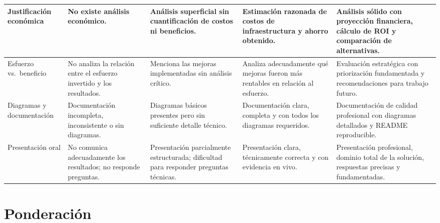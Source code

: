 \documentclass[12pt,a4paper]{article}
\begin{document}
\begin{longtable}{|p{2.8cm}|p{2.9cm}|p{2.9cm}|p{2.9cm}|p{2.9cm}|}
Justificación económica &
No existe análisis económico. &
Análisis superficial sin cuantificación de costos ni beneficios. &
Estimación razonada de costos de infraestructura y ahorro obtenido. &
Análisis sólido con proyección financiera, cálculo de ROI y comparación de alternativas. \\
\hline

Esfuerzo vs.\ beneficio &
No analiza la relación entre el esfuerzo invertido y los resultados. &
Menciona las mejoras implementadas sin análisis crítico. &
Analiza adecuadamente qué mejoras fueron más rentables en relación al esfuerzo. &
Evaluación estratégica con priorización fundamentada y recomendaciones para trabajo futuro. \\
\hline

Diagramas y documentación &
Documentación incompleta, inconsistente o sin diagramas. &
Diagramas básicos presentes pero sin suficiente detalle técnico. &
Documentación clara, completa y con todos los diagramas requeridos. &
Documentación de calidad profesional con diagramas detallados y README reproducible. \\
\hline

Presentación oral &
No comunica adecuadamente los resultados; no responde preguntas. &
Presentación parcialmente estructurada; dificultad para responder preguntas técnicas. &
Presentación clara, técnicamente correcta y con evidencia en vivo. &
Presentación profesional, dominio total de la solución, respuestas precisas y fundamentadas. \\
\hline

\end{longtable}

\normalsize

\section{Ponderación}
\end{document}

